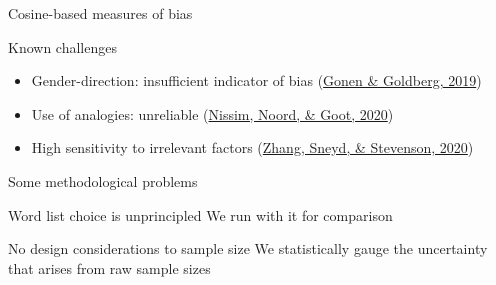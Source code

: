 \documentclass[
  10pt,
  ignorenonframetext,
  x11names, dvipsnames, bibspacing,natbib]{beamer}
\providecommand{\tightlist}{%
  \setlength{\itemsep}{0pt}\setlength{\parskip}{0pt}}
\begin{document}
\begin{frame}{Cosine-based measures of bias}
\protect\hypertarget{cosine-based-measures-of-bias-9}{}
\begin{block}{Known challenges}
\protect\hypertarget{known-challenges}{}
\begin{itemize}
\tightlist
\item
  Gender-direction: insufficient indicator of bias
  \footnotesize  (\protect\hyperlink{ref-Gonen2019lipstick}{Gonen \&
  Goldberg, 2019})
\end{itemize}

\normalsize

\begin{itemize}
\item
  Use of analogies: unreliable
  \footnotesize  (\protect\hyperlink{ref-Nissim2020fair}{Nissim, Noord,
  \& Goot, 2020}) \normalsize
\item
  High sensitivity to irrelevant factors
  \footnotesize  (\protect\hyperlink{ref-zhang2020robustness}{Zhang,
  Sneyd, \& Stevenson, 2020}) \normalsize
\end{itemize}
\end{block}
\end{frame}

\begin{frame}{Some methodological problems}
\protect\hypertarget{some-methodological-problems}{}
\begin{block}{Word list choice is unprincipled}
\protect\hypertarget{word-list-choice-is-unprincipled}{}
We run with it for comparison

\pause
\end{block}

\begin{block}{No design considerations to sample size}
\protect\hypertarget{no-design-considerations-to-sample-size}{}
We statistically gauge the uncertainty that arises from raw sample sizes
\end{block}
\end{frame}
\end{document}
